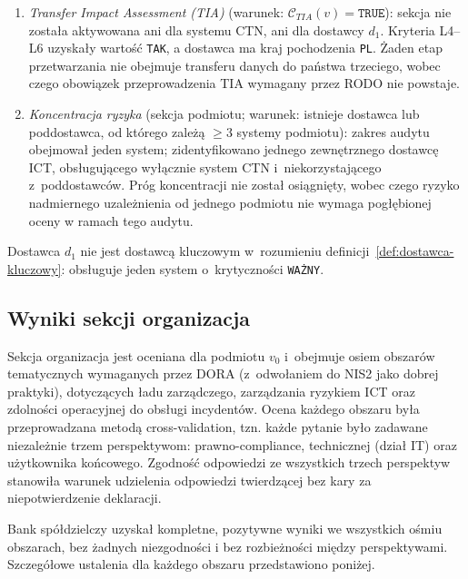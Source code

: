 \begin{enumerate}[label=(\roman*)]
  \item \textit{Transfer Impact Assessment (TIA)} (warunek: $\mathcal{C}_{TIA}(v) = \texttt{TRUE}$): sekcja nie została aktywowana ani dla systemu CTN, ani dla dostawcy $d_1$. Kryteria L4--L6 uzyskały wartość \texttt{TAK}, a dostawca ma kraj pochodzenia \texttt{PL}. Żaden etap przetwarzania nie obejmuje transferu danych do państwa trzeciego, wobec czego obowiązek przeprowadzenia TIA wymagany przez RODO nie powstaje.

  \item \textit{Koncentracja ryzyka} (sekcja podmiotu; warunek: istnieje dostawca lub poddostawca, od którego zależą $\geq 3$ systemy podmiotu): zakres audytu obejmował jeden system; zidentyfikowano jednego zewnętrznego dostawcę ICT, obsługującego wyłącznie system CTN i~niekorzystającego z~poddostawców. Próg koncentracji nie został osiągnięty, wobec czego ryzyko nadmiernego uzależnienia od jednego podmiotu nie wymaga pogłębionej oceny w ramach tego audytu.
\end{enumerate}

Dostawca $d_1$ nie jest dostawcą kluczowym w~rozumieniu definicji~\ref{def:dostawca-kluczowy}: obsługuje jeden system o~krytyczności \texttt{WAŻNY}.

\subsection{Wyniki sekcji organizacja}

Sekcja organizacja jest oceniana dla podmiotu $v_0$ i~obejmuje osiem obszarów tematycznych wymaganych przez DORA (z~odwołaniem do NIS2 jako dobrej praktyki), dotyczących ładu zarządczego, zarządzania ryzykiem ICT oraz zdolności operacyjnej do obsługi incydentów. Ocena każdego obszaru była przeprowadzana metodą cross-validation, tzn. każde pytanie było zadawane niezależnie trzem perspektywom: prawno-compliance, technicznej (dział IT) oraz użytkownika końcowego. Zgodność odpowiedzi ze wszystkich trzech perspektyw stanowiła warunek udzielenia odpowiedzi twierdzącej bez kary za niepotwierdzenie deklaracji.

Bank spółdzielczy uzyskał kompletne, pozytywne wyniki we wszystkich ośmiu obszarach, bez żadnych niezgodności i bez rozbieżności między perspektywami. Szczegółowe ustalenia dla każdego obszaru przedstawiono poniżej.

